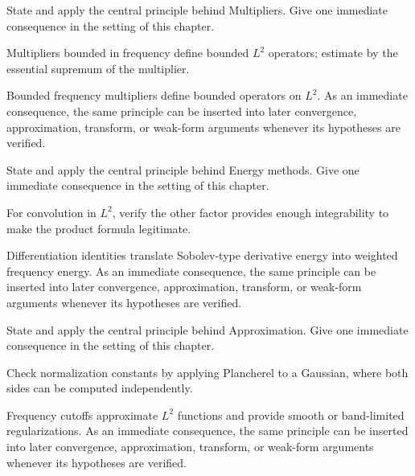 \begin{exercise}\label{exr:iii13-06}
State and apply the central principle behind Multipliers. Give one immediate consequence in the setting of this chapter.
\end{exercise}
\begin{hint}
Multipliers bounded in frequency define bounded \(L^2\) operators; estimate by the essential supremum of the multiplier.
\end{hint}
\begin{solution}
Bounded frequency multipliers define bounded operators on $L^2$. As an immediate consequence, the same principle can be inserted into later convergence, approximation, transform, or weak-form arguments whenever its hypotheses are verified.
\end{solution}

\begin{exercise}\label{exr:iii13-07}
State and apply the central principle behind Energy methods. Give one immediate consequence in the setting of this chapter.
\end{exercise}
\begin{hint}
For convolution in \(L^2\), verify the other factor provides enough integrability to make the product formula legitimate.
\end{hint}
\begin{solution}
Differentiation identities translate Sobolev-type derivative energy into weighted frequency energy. As an immediate consequence, the same principle can be inserted into later convergence, approximation, transform, or weak-form arguments whenever its hypotheses are verified.
\end{solution}

\begin{exercise}\label{exr:iii13-08}
State and apply the central principle behind Approximation. Give one immediate consequence in the setting of this chapter.
\end{exercise}
\begin{hint}
Check normalization constants by applying Plancherel to a Gaussian, where both sides can be computed independently.
\end{hint}
\begin{solution}
Frequency cutoffs approximate $L^2$ functions and provide smooth or band-limited regularizations. As an immediate consequence, the same principle can be inserted into later convergence, approximation, transform, or weak-form arguments whenever its hypotheses are verified.
\end{solution}


